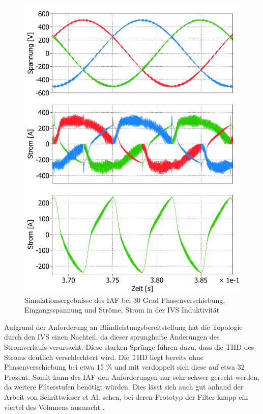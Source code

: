 \begin{figure}
	\centering
	\includegraphics[width=1\linewidth]{content/Grafiken/IAF_AC+L_30Grad}
	\caption{Simulationsergebnisse des IAF bei 30 Grad Phasenverschiebung, Eingangsspannung und Ströme, Strom in der IVS Induktivität }
	\label{fig:iafacl30grad}
\end{figure}
Aufgrund der Anforderung an Blindleistungsbereitstellung hat die Topologie durch den \gls{IVS} einen Nachteil, da dieser sprunghafte Änderungen des Stromverlaufs verursacht. Diese starken Sprünge führen dazu, dass die \gls{THD} des Stroms deutlich verschlechtert wird. Die \gls{THD} liegt bereits ohne Phasenverschiebung bei etwa 15 \% und mit verdoppelt sich diese auf etwa 32 Prozent.  Somit kann der \gls{IAF} den Anforderungen nur sehr schwer gerecht werden, da weitere Filterstufen benötigt würden. Dies lässt sich auch gut anhand der Arbeit von Schrittwieser et Al. sehen, bei deren Prototyp der Filter knapp ein viertel des Volumens ausmacht \cite{IAF99}.